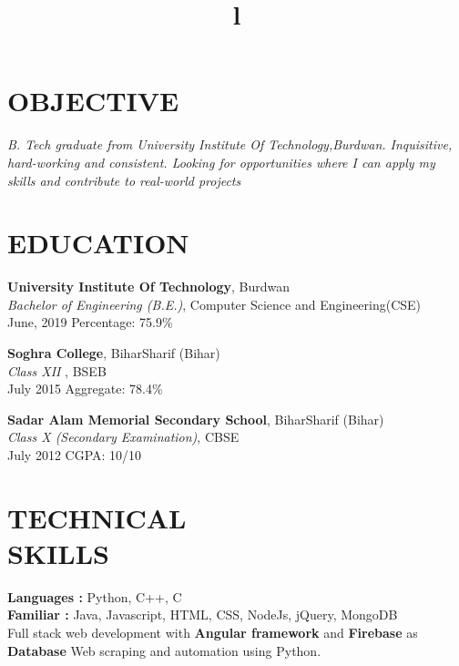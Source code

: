 \documentclass[margin]{res}
\begin{document}
\begin{resume}

\section{OBJECTIVE}
{\sl B. Tech graduate from University Institute Of Technology,Burdwan. Inquisitive, hard-working and consistent. Looking for opportunities where I can apply my skills and contribute to real-world projects }

\section{EDUCATION}
\textbf{University Institute Of Technology}, Burdwan\\
{\sl Bachelor of Engineering (B.E.)}, Computer Science and Engineering(CSE)\\
June, 2019
\hfill Percentage: 75.9\%

\textbf{Soghra College}, BiharSharif (Bihar) \\
{\sl Class XII }, BSEB\\
July 2015
\hfill Aggregate: 78.4\%

\textbf{Sadar Alam Memorial Secondary School}, BiharSharif (Bihar) \\
{\sl Class X (Secondary Examination)}, CBSE\\
July 2012
\hfill CGPA: 10/10



\section{TECHNICAL\\SKILLS}

\textbf{Languages : } Python, C++, C
\\
\textbf{Familiar : } Java, Javascript, HTML, CSS, NodeJs, jQuery, MongoDB \\
Full stack web development with \textbf{Angular framework} and \textbf{Firebase} as \textbf{Database} 
Web scraping and automation using Python.

\begin{format}
\title{l}\\
\\
\body\\
\end{format}


\end{resume}
\end{document}
